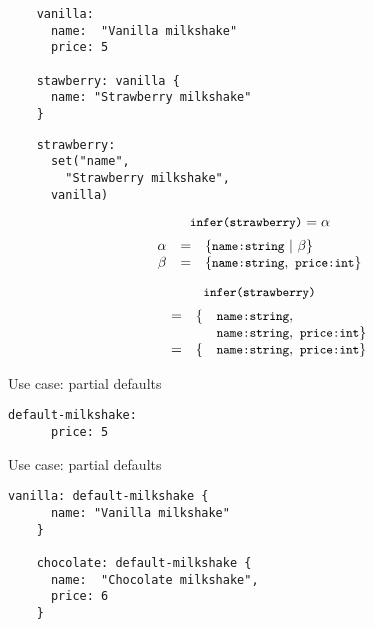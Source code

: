 \documentclass[20pt]{beamer}
\newcommand{\code}[1]{
    \texttt{\small{#1}}
}
\begin{document}
\begin{frame}
    \begin{lstlisting}
    vanilla:
      name:  "Vanilla milkshake"
      price: 5

    stawberry: vanilla {
      name: "Strawberry milkshake"
    }
    \end{lstlisting}
\end{frame}

\begin{frame}
    \begin{lstlisting}
    strawberry:
      set("name",
        "Strawberry milkshake",
      vanilla)
    \end{lstlisting}
\end{frame}


\begin{frame}
    \[
    \code{infer(strawberry)} = \alpha
    \]
    \[
    \begin{array}{rcl}
    \alpha & = & \{ \code{name:} \code{string} ~ | ~ \beta  \} \\
    \beta  & = & \{ \code{name:} \code{string}, ~ \code{price:} \code{int} \} \\
    \end{array}
    \]
\end{frame}

\begin{frame}
    \[
    \code{infer(strawberry)}
    \]
    \[
    \begin{array}{llll}
    ~ & = & \{ & \code{name:} \code{string}, \\
      &   &    & \code{name:} \code{string}, ~ \code{price:} \code{int} \} \\
      & = & \{ & \code{name:} \code{string}, ~ \code{price:} \code{int} \} \\
    \end{array}
    \]
\end{frame}

\begin{frame}[fragile]{Use case: partial defaults}
    \begin{lstlisting}[keywords = {}]
    default-milkshake:
      price: 5
    \end{lstlisting}
\end{frame}

\begin{frame}[fragile]{Use case: partial defaults}
    \begin{lstlisting}[keywords = {}]
    vanilla: default-milkshake {
      name: "Vanilla milkshake"
    }

    chocolate: default-milkshake {
      name:  "Chocolate milkshake",
      price: 6
    }
    \end{lstlisting}
\end{frame}
\end{document}
